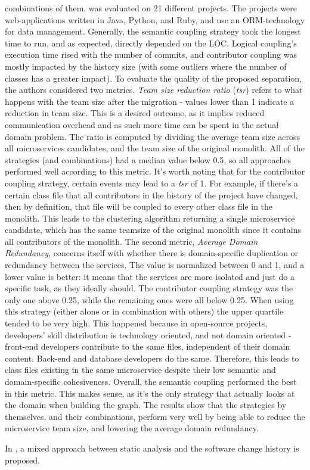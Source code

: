 combinations of them, was evaluated on 21 different projects. The projects were web-applications written in Java, Python, and Ruby, and use an ORM-technology for data management. Generally, the semantic coupling strategy took the longest time to run, and as expected, directly depended on the LOC. Logical coupling's execution time rised with the number of commits, and contributor coupling was mostly impacted by the history size (with some outliers where the number of classes has a greater impact). To evaluate the quality of the proposed separation, the authors considered two metrics. \textit{Team size reduction ratio} (\textit{tsr}) refers to what happens with the team size after the migration - values lower than 1 indicate a reduction in team size. This is a desired outcome, as it implies reduced communication overhead and as such more time can be spent in the actual domain problem. The ratio is computed by dividing the average team size across all microservices candidates, and the team size of the original monolith. %
All of the strategies (and combinations) had a median value below 0.5, so all approaches performed well according to this metric. It's worth noting that for the contributor coupling strategy, certain events may lead to a \textit{tsr} of 1. For example, if there's a certain class file that all contributors in the history of the project have changed, then by definition, that file will be coupled to every other class file in the monolith. This leads to the clustering algorithm returning a single microservice candidate, which has the same teamsize of the original monolith since it contains all contributors of the monolith. The second metric, \textit{Average Domain Redundancy}, concerns itself with whether there is domain-specific duplication or redundancy between the services. The value is normalized between 0 and 1, and a lower value is better: it means that the services are more isolated and just do a specific task, as they ideally should. The contributor coupling strategy was the only one above 0.25, while the remaining ones were all below 0.25. When using this strategy (either alone or in combination with others) the upper quartile tended to be very high. This happened because in open-source projects, developers' skill distribution is technology oriented, and not domain oriented - front-end developers contribute to the same files, independent of their domain content. Back-end and database developers do the same. Therefore, this leads to class files existing in the same microservice despite their low semantic and domain-specific cohesiveness.
Overall, the semantic coupling performed the best in this metric. This makes sense, as it's the only strategy that actually looks at the domain when building the graph. The results show that the strategies by themselves, and their combinations, perform very well by being able to reduce the microservice team size, and lowering the average domain redundancy.

In \cite{Santos_2021}, a mixed approach between static analysis and the software change history is proposed.